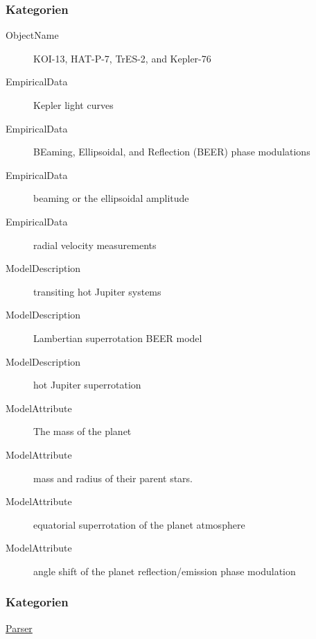 \documentclass[11pt]{beamer}
\begin{document}
\begin{frame}
	\frametitle{Kategorien}
	
	\begin{description}
		\item[ObjectName] KOI-13, HAT-P-7, TrES-2, and Kepler-76
		\item[EmpiricalData] Kepler light curves
		\item[EmpiricalData] BEaming, Ellipsoidal, and Reflection (BEER) phase modulations
		\item[EmpiricalData] beaming or the ellipsoidal amplitude
		\item[EmpiricalData]radial velocity measurements
		\item[ModelDescription] transiting hot Jupiter systems
		\item[ModelDescription]Lambertian superrotation BEER model	
		\item[ModelDescription] hot Jupiter superrotation
		\item[ModelAttribute] The mass of the planet
		\item[ModelAttribute] mass and radius of their parent stars.
		\item[ModelAttribute]equatorial superrotation of the planet atmosphere
		\item[ModelAttribute] angle shift of the planet reflection/emission phase modulation
	\end{description}
	
\end{frame}

\begin{frame}
	\frametitle{Kategorien}

\href{https://spacy-vis.apps.allenai.org/spacy-parser}{Parser}

\end{frame}
\end{document}

